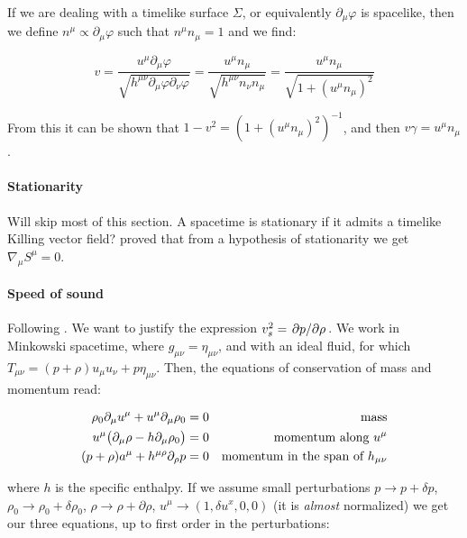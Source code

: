 \documentclass[main.tex]{subfiles}
\begin{document}
If we are dealing with a timelike surface \(\Sigma\), or equivalently \(\partial_\mu \varphi\) is spacelike, then we define \(n^\mu \propto \partial_\mu \varphi\) such that \(n^\mu n_\mu = 1\) and we find:

\begin{equation}
    v = \frac{u^\mu \partial_\mu \varphi}{\sqrt{h^{\mu\nu} \partial_\mu \varphi \partial_\nu \varphi}}
    = \frac{u^\mu n_\mu}{\sqrt{h^{\mu\nu} n_\nu n_\mu}}
    = \frac{u^\mu n_\mu}{\sqrt{1 + (u^\mu n_\mu)^2}}
\end{equation}

From this it can be shown that \(1-v^2 = (1+(u^\mu n_\mu)^2)^{-1}\), and then \(v \gamma = u^\mu n_\mu\).

\paragraph{Stationarity}

Will skip most of this section. A spacetime is stationary if it admits a timelike Killing vector field? \textcite[]{Ehlers:1971} proved that from a hypothesis of stationarity we get \(\nabla_\mu S^\mu = 0\).

\paragraph{Speed of sound}

Following \cite[]{Yoshida:2011}.
We want to justify the expression \(v_s^2 = \pdv*{p}{\rho} \). We work in Minkowski spacetime, where \(g_{\mu\nu} = \eta_{\mu\nu}\), and with an ideal fluid, for which \(T_{\mu\nu} = (p+ \rho) u_\mu u_\nu + p \eta_{\mu\nu}\). Then, the equations of conservation of mass and momentum read:

\begin{subequations}
\begin{align}
  \rho_0 \partial_\mu u^\mu + u^\mu \partial_\mu \rho_0 &= 0 & \text{mass}  \\
  u^\mu \qty(\partial_\mu \rho - h \partial_\mu \rho_0) &=0 & \text{momentum along } u^\mu  \\
  (p+\rho) a^\mu + h^{\mu \rho} \partial_\rho p &=0 & \text{momentum in the span of } h_{\mu\nu}
\end{align}
\end{subequations}

where \(h\) is the specific enthalpy. If we assume small perturbations \(p \rightarrow p + \delta p\), \(\rho_0 \rightarrow \rho_0 + \delta \rho_0\), \(\rho \rightarrow \rho + \partial \rho\), \(u^\mu \rightarrow (1, \delta u^x, 0, 0)\) (it is \emph{almost} normalized) we get our three equations, up to first order in the perturbations:
\end{document}
